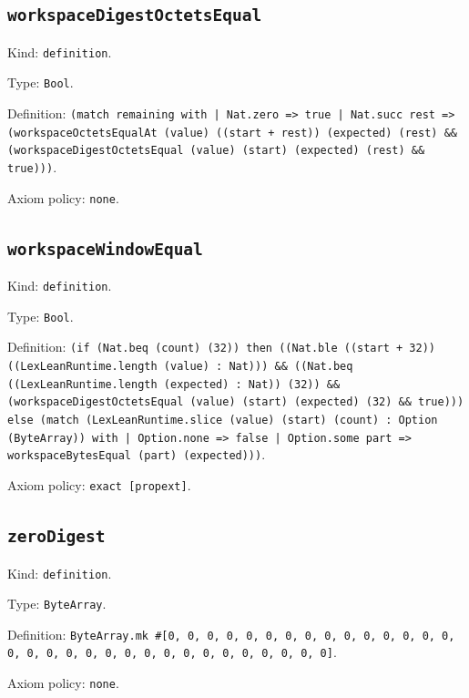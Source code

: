 \documentclass[11pt]{article}
\begin{document}
\subsection*{\texttt{workspaceDigestOctetsEqual}}
\noindent Kind: \texttt{definition}.\par
\noindent Type: \texttt{Bool}.\par
\noindent Definition: \texttt{(match remaining with | Nat.zero => true | Nat.succ rest => (workspaceOctetsEqualAt (value) ((start + rest)) (expected) (rest) \&\& (workspaceDigestOctetsEqual (value) (start) (expected) (rest) \&\& true)))}.\par
\noindent Axiom policy: \texttt{none}.\par
\subsection*{\texttt{workspaceWindowEqual}}
\noindent Kind: \texttt{definition}.\par
\noindent Type: \texttt{Bool}.\par
\noindent Definition: \texttt{(if (Nat.beq (count) (32)) then ((Nat.ble ((start + 32)) ((LexLeanRuntime.length (value) : Nat))) \&\& ((Nat.beq ((LexLeanRuntime.length (expected) : Nat)) (32)) \&\& (workspaceDigestOctetsEqual (value) (start) (expected) (32) \&\& true))) else (match (LexLeanRuntime.slice (value) (start) (count) : Option (ByteArray)) with | Option.none => false | Option.some part => workspaceBytesEqual (part) (expected)))}.\par
\noindent Axiom policy: \texttt{exact [propext]}.\par
\subsection*{\texttt{zeroDigest}}
\noindent Kind: \texttt{definition}.\par
\noindent Type: \texttt{ByteArray}.\par
\noindent Definition: \texttt{ByteArray.mk \#[0, 0, 0, 0, 0, 0, 0, 0, 0, 0, 0, 0, 0, 0, 0, 0, 0, 0, 0, 0, 0, 0, 0, 0, 0, 0, 0, 0, 0, 0, 0, 0]}.\par
\noindent Axiom policy: \texttt{none}.\par
\end{document}
